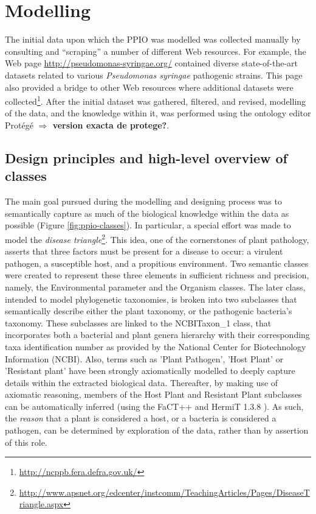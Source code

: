 \documentclass[sw]{iosart2c}
\newcommand{\myurl}[1]{\footnote{\url{#1}}}
\newcommand{\todo}[1]{\textbf{{\color{blue}$\Longrightarrow$ #1}}}
\begin{document}



\section{Modelling}

The initial data upon which the PPIO was modelled was collected manually by consulting and ``scraping'' a number of different Web resources. For example, the Web page \url{http://pseudomonas-syringae.org/} contained diverse state-of-the-art datasets related to various {\itshape Pseudomonas syringae} pathogenic strains. This page also provided a bridge to other Web resources where additional datasets were collected\myurl{http://ncppb.fera.defra.gov.uk/}. After the initial dataset was gathered, filtered, and revised, modelling of the data, and the knowledge within it, was performed using the ontology editor Prot\'eg\'e \todo{version exacta de protege?}.

\subsection{Design principles and high-level overview of classes}

The main goal pursued during the modelling and designing process was to semantically capture as much of the biological knowledge within the data as possible (Figure \ref{fig:ppio-classes}). In particular, a special effort was made to model the {\itshape disease triangle}\myurl{http://www.apsnet.org/edcenter/instcomm/TeachingArticles/Pages/DiseaseTriangle.aspx}. This idea, one of the cornerstones of plant pathology, asserts that three factors must be present for a disease to occur: a virulent pathogen, a susceptible host, and a propitious environment. Two semantic classes were created to represent these three elements in sufficient richness and precision, namely, the {\sf Environmental parameter} and the {\sf Organism} classes. The later class, intended to model phylogenetic taxonomies, is broken into two subclasses that semantically describe either the plant taxonomy, or the pathogenic bacteria's taxonomy.  These subclasses are linked to the {\sf NCBITaxon\_1} class, that incorporates both a bacterial and plant genera hierarchy with their corresponding taxa identification number as provided by the National Center for Biotechnology Information (NCBI). Also, terms such as {\sf 'Plant Pathogen'}, {\sf 'Host Plant'} or {\sf 'Resistant plant'} have been strongly axiomatically modelled to deeply capture details within the extracted biological data.  Thereafter, by making use of axiomatic reasoning, members of the {\sf Host Plant} and {\sf Resistant Plant} subclasses can be automatically inferred (using the FaCT++ \cite{TsHo06a} and HermiT 1.3.8 \cite{hermit}). As such, the {\itshape reason} that a plant is considered a host, or a bacteria is considered a pathogen, can be determined by exploration of the data, rather than by assertion of this role.
\end{document}
